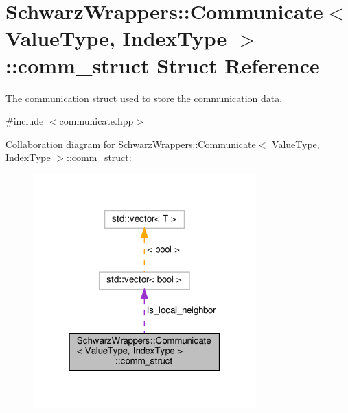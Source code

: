 \hypertarget{structSchwarzWrappers_1_1Communicate_1_1comm__struct}{}\section{Schwarz\+Wrappers\+:\+:Communicate$<$ Value\+Type, Index\+Type $>$\+:\+:comm\+\_\+struct Struct Reference}
\label{structSchwarzWrappers_1_1Communicate_1_1comm__struct}


The communication struct used to store the communication data.  




{\ttfamily \#include $<$communicate.\+hpp$>$}



Collaboration diagram for Schwarz\+Wrappers\+:\+:Communicate$<$ Value\+Type, Index\+Type $>$\+:\+:comm\+\_\+struct\+:
\nopagebreak
\begin{figure}[H]
\begin{center}
\leavevmode
\includegraphics[width=244pt]{structSchwarzWrappers_1_1Communicate_1_1comm__struct__coll__graph}
\end{center}
\end{figure}
